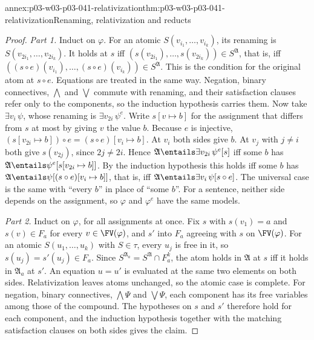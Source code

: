 \begin{annexitem}{annex:p03-w03-p03-041-relativization}{thm:p03-w03-p03-041-relativization}{Renaming, relativization and reducts}
\begin{proof}
\emph{Part 1.} Induct on \(\varphi\). For an atomic
\(S(v_{i_1},\ldots,v_{i_k})\), its renaming is
\(S(v_{2i_1},\ldots,v_{2i_k})\). It holds at \(s\) iff
\((s(v_{2i_1}),\ldots,s(v_{2i_k}))\in S^{\mathfrak A}\), that is, iff
\(((s\circ e)(v_{i_1}),\ldots,(s\circ e)(v_{i_k}))\in S^{\mathfrak A}\).
This is the condition for the original atom at \(s\circ e\). Equations
are treated in the same way. Negation, binary connectives, \(\bigwedge\)
and \(\bigvee\) commute with renaming, and their satisfaction clauses
refer only to the components, so the induction hypothesis carries them.
Now take \(\exists v_i\,\psi\), whose renaming is
\(\exists v_{2i}\,\psi^{e}\). Write \(s[v\mapsto b]\) for the assignment
that differs from \(s\) at most by giving \(v\) the value \(b\). Because
\(e\) is injective,
\((s[v_{2i}\mapsto b])\circ e=(s\circ e)[v_i\mapsto b]\). At \(v_i\) both
sides give \(b\). At \(v_j\) with \(j\neq i\) both give \(s(v_{2j})\),
since \(2j\neq2i\). Hence \(\mathfrak A\entails\exists v_{2i}\,\psi^{e}[s]\)
iff some \(b\) has \(\mathfrak A\entails\psi^{e}[s[v_{2i}\mapsto b]]\). By
the induction hypothesis this holds iff some \(b\) has
\(\mathfrak A\entails\psi[(s\circ e)[v_i\mapsto b]]\), that is, iff
\(\mathfrak A\entails\exists v_i\,\psi[s\circ e]\). The universal case is
the same with ``every \(b\)'' in place of ``some \(b\)''. For a sentence,
neither side depends on the assignment, so \(\varphi\) and
\(\varphi^{e}\) have the same models.

\emph{Part 2.} Induct on \(\varphi\), for all assignments at once. Fix
\(s\) with \(s(v_1)=a\) and \(s(v)\in F_a\) for every
\(v\in\FV(\varphi)\), and \(s'\) into \(F_a\) agreeing with \(s\) on
\(\FV(\varphi)\). For an atomic \(S(u_1,\ldots,u_k)\) with
\(S\in\tau\), every \(u_j\) is free in it, so
\(s(u_j)=s'(u_j)\in F_a\). Since
\(S^{\mathfrak A_a}=S^{\mathfrak A}\cap F_a^{k}\), the atom holds in
\(\mathfrak A\) at \(s\) iff it holds in \(\mathfrak A_a\) at \(s'\).
An equation \(u=u'\) is evaluated at the same two elements on both sides.
Relativization leaves atoms unchanged, so the atomic case is complete. For
negation, binary connectives, \(\bigwedge\Psi\) and \(\bigvee\Psi\), each
component has its free variables among those of the compound. The
hypotheses on \(s\) and \(s'\) therefore hold for each component, and the
induction hypothesis together with the matching satisfaction clauses on
both sides gives the claim.


\end{proof}
\end{annexitem}
